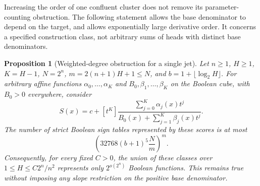 \documentclass[11pt]{article}
\newtheorem{proposition}{Proposition}
\begin{document}
Increasing the order of one confluent cluster does not remove its
parameter-counting obstruction. The following statement allows the
base denominator to depend on the target, and allows exponentially
large derivative order. It concerns a specified construction class,
not arbitrary sums of heads with distinct base denominators.

\begin{proposition}[Weighted-degree obstruction for a single jet]
Let $n\ge1$, $H\ge1$, $K=H-1$, $N=2^n$,
$m=2(n+1)H+1\le N$, and $b=1+\lfloor\log_2H\rfloor$.
For arbitrary affine functions $\alpha_0,\ldots,\alpha_K$ and
$B_0,\beta_1,\ldots,\beta_K$ on the Boolean cube, with $B_0>0$
everywhere, consider
\[
 S(x)=c+[t^K]\frac{\sum_{j=0}^K\alpha_j(x)t^j}
 {B_0(x)+\sum_{j=1}^K\beta_j(x)t^j}.
\]
The number of strict Boolean sign tables represented by these scores
is at most
\[
 \left(32768(b+1)^5\frac Nm\right)^m.
\]
Consequently, for every fixed $C>0$, the union of these classes over
$1\le H\le C2^n/n^2$ represents only $2^{o(2^n)}$ Boolean functions.
This remains true without imposing any slope restriction on the
positive base denominator.
\end{proposition}
\end{document}
